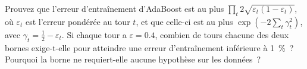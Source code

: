 \begin{question}\label{iq:iv1:machine-learning:45}
Prouvez que l'erreur d'entraînement d'AdaBoost est au plus $\prod_t 2\sqrt{\varepsilon_t(1 - \varepsilon_t)}$, où $\varepsilon_t$ est l'erreur pondérée au tour $t$, et que celle-ci est au plus $\exp(-2\sum_t\gamma_t^2)$, avec $\gamma_t = \frac12 - \varepsilon_t$. Si chaque tour a $\varepsilon = 0.4$, combien de tours chacune des deux bornes exige-t-elle pour atteindre une erreur d'entraînement inférieure à 1~\%~? Pourquoi la borne ne requiert-elle aucune hypothèse sur les données~?
\end{question}
